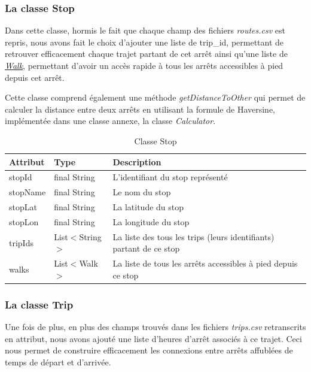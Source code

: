 \documentclass[12pt]{article}
\begin{document}
\subsubsection{La classe Stop}
Dans cette classe, hormis le fait que chaque champ des fichiers \emph{routes.csv} est repris, nous avons fait le choix d'ajouter
une liste de trip\_id, permettant de retrouver efficacement chaque trajet partant de cet arrêt ainsi qu'une liste de \hyperref[sec:walk]{\emph{Walk}}, permettant
d'avoir un accès rapide à tous les arrêts accessibles à pied depuis cet arrêt.

Cette classe comprend également une méthode \emph{getDistanceToOther} qui permet de calculer la distance entre deux arrêts en utilisant la formule de Haversine,
implémentée dans une classe annexe, la classe \emph{Calculator}.

\begin{table}[h]
    \centering
    \begin{tabular}{|l|l|p{8cm}|}
    \hline
    \textbf{Attribut} & \textbf{Type} & \textbf{Description} \\
    \hline
    stopId & final String & L'identifiant du stop représenté \\
    stopName & final String & Le nom du stop \\
    stopLat & final String & La latitude du stop \\
    stopLon & final String & La longitude du stop \\
    tripIds & List$<$String$>$ & La liste des tous les trips (leurs identifiants) partant de ce stop \\
    walks & List$<$Walk$>$ & La liste de tous les arrêts accessibles à pied depuis ce stop \\
    \hline
    \end{tabular}
    \caption{Classe Stop}
\end{table}

\subsubsection{La classe Trip}
\label{sec:trip}
Une fois de plus, en plus des champs trouvés dans les fichiers \emph{trips.csv} retranscrits en attribut, nous avons ajouté
une liste d'heures d'arrêt associés à ce trajet. Ceci nous permet de construire efficacement les connexions entre arrêts affublées
de temps de départ et d'arrivée.
\end{document}
